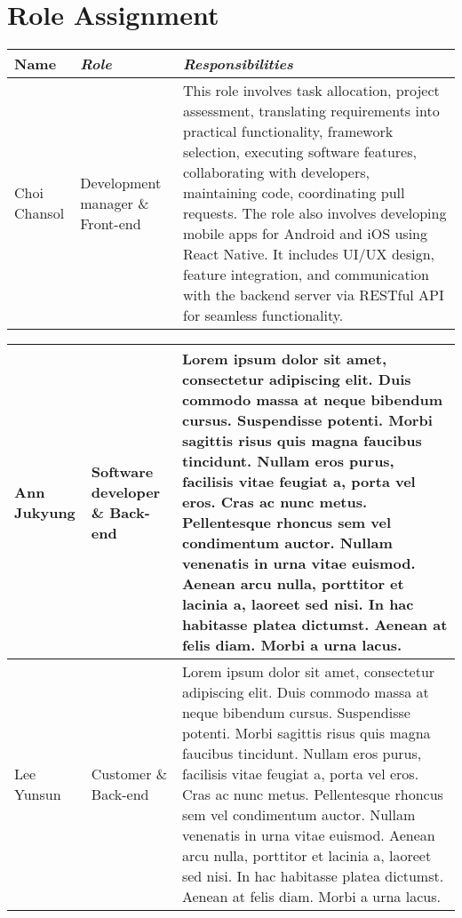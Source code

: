 \documentclass[conference]{IEEEtran}
\begin{document}
\section{Role Assignment}
\begin{table}[!htbp]\normalsize
\begin{center}
\begin{tabular}{|p{1.2cm}|p{1.9cm}|p{4.5cm}|}
\hline
\textbf{Name} & \textbf{\textit{Role}}& \textbf{\textit{Responsibilities}}\\
\hline
Choi Chansol & Development manager \& Front-end &
This role involves task allocation, project assessment, translating requirements into practical functionality, framework selection, executing software features, collaborating with developers, maintaining code, coordinating pull requests.\newline 
\newline The role also involves developing mobile apps for Android and iOS using React Native. It includes UI/UX design, feature integration, and communication with the backend server via RESTful API for seamless functionality.
\\ \hline
\end{tabular}
\label{tab1}
\end{center}
\end{table}
\newpage
\begin{table}[!htbp]\normalsize
\begin{center}
\begin{tabular}{|p{1.2cm}|p{1.9cm}|p{4.5cm}|}
\hline
Ann Jukyung & Software developer \& Back-end &
Lorem ipsum dolor sit amet, consectetur adipiscing elit. Duis commodo massa at neque bibendum cursus. Suspendisse potenti. Morbi sagittis risus quis magna faucibus tincidunt. Nullam eros purus, facilisis vitae feugiat a, porta vel eros. Cras ac nunc metus. Pellentesque rhoncus sem vel condimentum auctor. Nullam venenatis in urna vitae euismod. Aenean arcu nulla, porttitor et lacinia a, laoreet sed nisi. In hac habitasse platea dictumst. Aenean at felis diam. Morbi a urna lacus.
\\ \hline
Lee Yunsun & Customer \& Back-end &
Lorem ipsum dolor sit amet, consectetur adipiscing elit. Duis commodo massa at neque bibendum cursus. Suspendisse potenti. Morbi sagittis risus quis magna faucibus tincidunt. Nullam eros purus, facilisis vitae feugiat a, porta vel eros. Cras ac nunc metus. Pellentesque rhoncus sem vel condimentum auctor. Nullam venenatis in urna vitae euismod. Aenean arcu nulla, porttitor et lacinia a, laoreet sed nisi. In hac habitasse platea dictumst. Aenean at felis diam. Morbi a urna lacus.
\\ \hline
\end{tabular}
\label{tab2}
\end{center}
\end{table}
\end{document}
